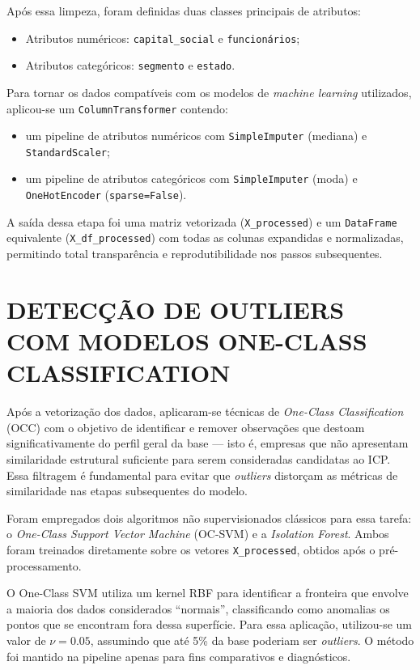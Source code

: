 Após essa limpeza, foram definidas duas classes principais de atributos:
\begin{itemize}
    \item Atributos numéricos: \texttt{capital\_social} e \texttt{funcionários};
    \item Atributos categóricos: \texttt{segmento} e \texttt{estado}.
\end{itemize}

Para tornar os dados compatíveis com os modelos de \textit{machine learning} utilizados, aplicou-se um \texttt{ColumnTransformer} contendo:
\begin{itemize}
    \item um pipeline de atributos numéricos com \texttt{SimpleImputer} (mediana) e \texttt{StandardScaler};
    \item um pipeline de atributos categóricos com \texttt{SimpleImputer} (moda) e \texttt{OneHotEncoder} (\texttt{sparse=False}).
\end{itemize}

A saída dessa etapa foi uma matriz vetorizada (\texttt{X\_processed}) e um \texttt{DataFrame} equivalente (\texttt{X\_df\_processed}) com todas as colunas expandidas e normalizadas, permitindo total transparência e reprodutibilidade nos passos subsequentes. 


\section{DETECÇÃO DE OUTLIERS COM MODELOS ONE-CLASS CLASSIFICATION}

Após a vetorização dos dados, aplicaram-se técnicas de \textit{One-Class Classification} (OCC) com o objetivo de identificar e remover observações que destoam significativamente do perfil geral da base — isto é, empresas que não apresentam similaridade estrutural suficiente para serem consideradas candidatas ao ICP. Essa filtragem é fundamental para evitar que \textit{outliers} distorçam as métricas de similaridade nas etapas subsequentes do modelo.

Foram empregados dois algoritmos não supervisionados clássicos para essa tarefa: o \textit{One-Class Support Vector Machine} (OC-SVM) e a \textit{Isolation Forest}. Ambos foram treinados diretamente sobre os vetores \texttt{X\_processed}, obtidos após o pré-processamento.

O One-Class SVM utiliza um kernel RBF para identificar a fronteira que envolve a maioria dos dados considerados ``normais'', classificando como anomalias os pontos que se encontram fora dessa superfície. Para essa aplicação, utilizou-se um valor de $\nu = 0.05$, assumindo que até 5\% da base poderiam ser \textit{outliers}. O método foi mantido na pipeline apenas para fins comparativos e diagnósticos.

